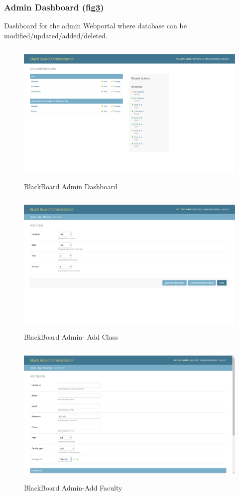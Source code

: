 \documentclass[BTech]{srmuthesis}
\begin{document}
\subsubsection{Admin Dashboard (fig\ref{fig:django-dash})}
Dashboard for the admin Webportal where database can be modified/updated/added/deleted.
\begin{figure}[htbp]
	\centering
	\includegraphics[width=\linewidth, height=7cm,keepaspectratio]{djangomanage}
	\caption{BlackBoard Admin Dashboard}
	\label{fig:django-dash}
\end{figure}
\begin{figure}[htbp]
	\centering
	\includegraphics[width=\linewidth, height=7cm,keepaspectratio]{addclass}
	\caption{BlackBoard Admin- Add Class}
	\label{fig:django-dash}
\end{figure}
\begin{figure}[htbp]
	\centering
	\includegraphics[width=\linewidth, height=7cm,keepaspectratio]{addfaculty}
	\caption{BlackBoard Admin-Add Faculty}
	\label{fig:django-dash}
\end{figure}
\end{document}
